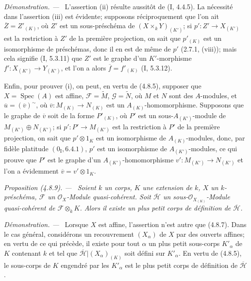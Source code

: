 \documentclass[10pt,oneside]{book}
\newenvironment{proposition}[1][]{%
  \par\medskip\noindent\itshape Proposition (#1). ---\ }{\par}
\newenvironment{proof}{%
  \par\medskip\noindent\textit{Démonstration. ---\ }}{\par}
\begin{document}
\begin{proof}
L'assertion (ii) résulte aussitôt de (I, 4.4.5). La nécessité dans l'assertion
(iii) est évidente; supposons réciproquement que l'on ait
$\overline Z=Z'_{(K)}$, où $Z'$ est un sous-préschéma de
$(X\times_kY)_{(K')}$; si $p':Z'\to X_{(K')}$ est la restriction à $Z'$ de la
première projection, on sait que $p'_{(K)}$ est un isomorphisme de préschémas,
donc il en est de même de $p'$ (2.7.1, (viii)); mais cela signifie (I, 5.3.11)
que $Z'$ est le graphe d'un $K'$-morphisme
$f':X_{(K')}\to Y_{(K')}$, et l'on a alors
$\overline f=f'_{(K)}$ (I, 5.3.12).

Enfin, pour prouver (i), on peut, en vertu de (4.8.5), supposer que
$X=\operatorname{Spec}(A)$ est affine, $\mathscr F=\widetilde M$,
$\mathscr G=\widetilde N$, où $M$ et $N$ sont des $A$-modules, et
$\overline u=(\overline v)^{\sim}$, où
$\overline v:M_{(K)}\to N_{(K)}$ est un $A_{(K)}$-homomorphisme. Supposons
que le graphe de $\overline v$ soit de la forme $P'_{(K)}$, où $P'$ est un
sous-$A_{(K')}$-module de $M_{(K')}\oplus N_{(K')}$; si
$p':P'\to M_{(K')}$ est la restriction à $P'$ de la première projection, on
sait que $p'\otimes1_K$ est un isomorphisme de $A_{(K)}$-modules, donc, par
fidèle platitude $(0_{\mathrm I},6.4.1)$, $p'$ est un isomorphisme de
$A_{(K')}$-modules, ce qui prouve que $P'$ est le graphe d'un
$A_{(K')}$-homomorphisme $v':M_{(K')}\to N_{(K')}$ et l'on a évidemment
$\overline v=v'\otimes1_K$.
\end{proof}

\begin{proposition}[4.8.9]
\label{IV.2.4.8.9-fr}
Soient $k$ un corps, $K$ une extension de $k$, $X$ un $k$-préschéma,
$\mathscr F$ un $\mathcal O_X$-Module quasi-cohérent. Soit $\overline{\mathscr H}$ un
sous-$\mathcal O_{X_{(K)}}$-Module quasi-cohérent de
$\mathscr F\otimes_kK$. Alors il existe un plus petit corps de définition de
$\overline{\mathscr H}$.
\end{proposition}

\begin{proof}
Lorsque $X$ est affine, l'assertion n'est autre que (4.8.7). Dans le cas
général, considérons un recouvrement $(X_\alpha)$ de $X$ par des ouverts
affines; en vertu de ce qui précède, il existe pour tout $\alpha$ un plus petit
sous-corps $K'_\alpha$ de $K$ contenant $k$ et tel que
$\overline{\mathscr H}|(X_\alpha)_{(K)}$ soit défini sur $K'_\alpha$. En vertu de
(4.8.5), le sous-corps de $K$ engendré par les $K'_\alpha$ est le plus petit
corps de définition de $\overline{\mathscr H}$.
\end{proof}
\end{document}
